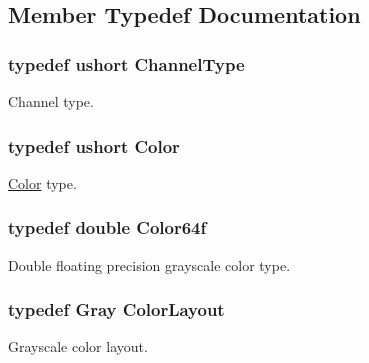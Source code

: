 \subsection{Member Typedef Documentation}
\hypertarget{struct_d_o_1_1_color_traits_3_01ushort_01_4_a99998126b2448d8950e0509f25ebc9ed}{
\subsubsection[{Channel\-Type}]{\setlength{\rightskip}{0pt plus 5cm}typedef {\bf ushort} {\bf Channel\-Type}}}\label{struct_d_o_1_1_color_traits_3_01ushort_01_4_a99998126b2448d8950e0509f25ebc9ed}
Channel type. \hypertarget{struct_d_o_1_1_color_traits_3_01ushort_01_4_a1ef69be3e9e9a4da299f5111fc591a79}{
\subsubsection[{Color}]{\setlength{\rightskip}{0pt plus 5cm}typedef {\bf ushort} {\bf Color}}}\label{struct_d_o_1_1_color_traits_3_01ushort_01_4_a1ef69be3e9e9a4da299f5111fc591a79}
\hyperlink{class_d_o_1_1_color}{Color} type. \hypertarget{struct_d_o_1_1_color_traits_3_01ushort_01_4_a9a301fd8ba0a7225e38351d3e5b2e4d3}{
\subsubsection[{Color64f}]{\setlength{\rightskip}{0pt plus 5cm}typedef double {\bf Color64f}}}\label{struct_d_o_1_1_color_traits_3_01ushort_01_4_a9a301fd8ba0a7225e38351d3e5b2e4d3}
Double floating precision grayscale color type. \hypertarget{struct_d_o_1_1_color_traits_3_01ushort_01_4_a7c9d599cfa0d1404784fbe60e6bcfd24}{
\subsubsection[{Color\-Layout}]{\setlength{\rightskip}{0pt plus 5cm}typedef {\bf Gray} {\bf Color\-Layout}}}\label{struct_d_o_1_1_color_traits_3_01ushort_01_4_a7c9d599cfa0d1404784fbe60e6bcfd24}
Grayscale color layout. 

